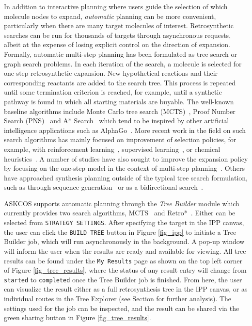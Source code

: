 \documentclass[pdflatex,sn-mathphys-num]{sn-jnl}%
\theoremstyle{thmstyleone}%
\theoremstyle{thmstyletwo}%
\theoremstyle{thmstylethree}%
\begin{document}
In addition to interactive planning where users guide the selection of which molecule nodes to expand, \emph{automatic} planning can be more convenient, particularly when there are many target molecules of interest. Retrosynthetic searches can be run for thousands of targets through asynchronous requests, albeit at the expense of losing explicit control on the direction of expansion. Formally, automatic multi-step planning has been formulated as tree search or graph search problems. In each iteration of the search, a molecule is selected for one-step retrosynthetic expansion. New hypothetical reactions and their corresponding reactants are added to the search tree. This process is repeated until some termination criterion is reached, for example, until a synthetic pathway is found in which all starting materials are buyable. The well-known baseline algorithms include Monte Carlo tree search (MCTS)~\citep{segler_planning_2018,lin_automatic_2020}, Proof Number Search (PNS)~\citep{heifets_construction_2012,kishimoto_depth-first_2019} and A* Search~\citep{chen_retro_2020} which tend to be inspired by other artificial intelligence applications such as AlphaGo~\citep{silver_mastering_2016}. More recent work in the field on such search algorithms has mainly focused on improvement of selection policies, for example, with reinforcement learning~\citep{liu_retrosynthetic_2023, yu_grasp_2022,schreck_learning_2019, wang_towards_2020}, supervised learning~\citep{xie_retrograph_2022,zhao_efficient_2024, hong_retrosynthetic_2023}, or chemical heuristics~\citep{schwaller_predicting_2020, kreutter_multistep_2023}. A number of studies have also sought to improve the expansion policy by focusing on the one-step model in the context of multi-step planning~\citep{liu_fusionretro_2023,kim_self-improved_2021}. Others have approached synthesis planning outside of the typical tree search formulation, such as through sequence generation~\citep{shee_directmultistep_2024} or as a bidirectional search~\citep{yu_double-ended_2024}.

ASKCOS supports automatic planning through the \emph{Tree Builder} module which currently provides two search algorithms, MCTS~\citep{segler_planning_2018} and Retro*~\citep{chen_retro_2020}. Either can be selected from \texttt{STRATEGY SETTINGS}. After specifying the target in the IPP canvas, the user can click the \texttt{BUILD TREE} button in Figure \ref{fig_ipp} to initiate a Tree Builder job, which will run asynchronously in the background. A pop-up window will inform the user when the results are ready and available for viewing. All tree results can be found under the \texttt{My Results} page as shown on the top left corner of Figure \ref{fig_tree_results}, where the status of any result entry will change from \texttt{started} to \texttt{completed} once the Tree Builder job is finished. From here, the user can visualize the result either as a full retrosynthesis tree in the IPP canvas, or as individual routes in the Tree Explorer (see Section  for further analysis). The settings used for the job can be inspected, and the result can be shared via the green sharing button in Figure \ref{fig_tree_results}.
\end{document}
